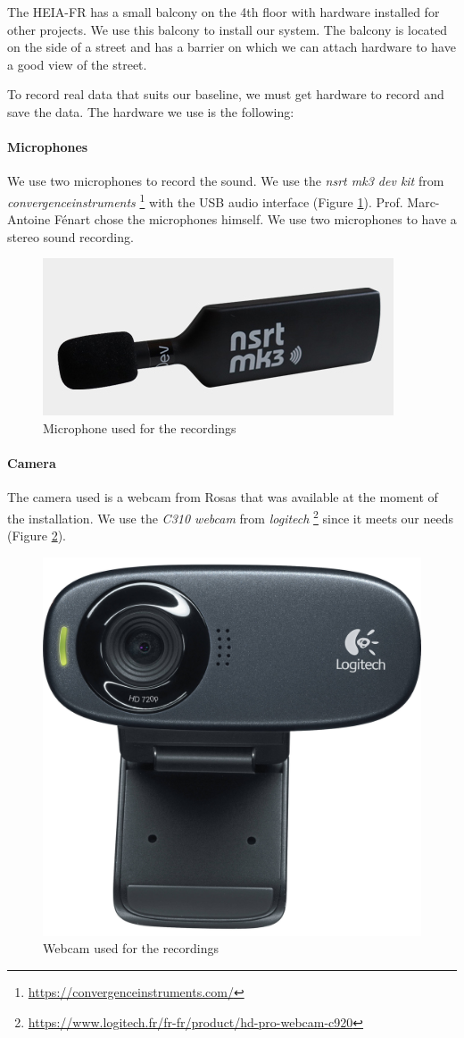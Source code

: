 The HEIA-FR has a small balcony on the 4th floor with hardware installed for other projects. We use this balcony to install our system. The balcony is located on the side of a street and has a barrier on which we can attach hardware to have a good view of the street. 

To record real data that suits our baseline, we must get hardware to record and save the data. The hardware we use is the following:

\paragraph{Microphones}
We use two microphones to record the sound. We use the \textit{nsrt mk3 dev kit} from \textit{convergenceinstruments} \footnote{\url{https://convergenceinstruments.com/}} with the USB audio interface (Figure \ref{fig:nsrt_mk3_mic}). Prof. Marc-Antoine Fénart chose the microphones himself. We use two microphones to have a stereo sound recording.

\begin{figure}[H]
    \centering
    \includegraphics[width=.5\textwidth]{images/nsrt_mk3_mic.png}
    \caption{Microphone used for the recordings}
    \label{fig:nsrt_mk3_mic}
\end{figure}

\paragraph{Camera}
The camera used is a webcam from Rosas that was available at the moment of the installation. We use the \textit{C310 webcam} from \textit{logitech} \footnote{\url{https://www.logitech.fr/fr-fr/product/hd-pro-webcam-c920}} since it meets our needs (Figure \ref{fig:c310_webcam}). 

\begin{figure}[H]
    \centering
    \includegraphics[width=.5\textwidth]{images/c310_webcam.png}
    \caption{Webcam used for the recordings}
    \label{fig:c310_webcam}
\end{figure}

